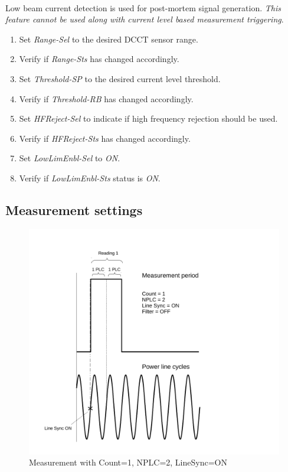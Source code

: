 \documentclass[openany]{article}
\begin{document}
		\paragraph{} Low beam current detection is used for post-mortem signal generation. \emph{This feature cannot be used along with current level based measurement triggering}.

			\begin{enumerate}
				\item Set \emph{Range-Sel} to the desired DCCT sensor range.
				\item Verify if \emph{Range-Sts} has changed accordingly.
				\item Set \emph{Threshold-SP} to the desired current level threshold.
				\item Verify if \emph{Threshold-RB} has changed accordingly.
				\item Set \emph{HFReject-Sel} to indicate if high frequency rejection should be used.
				\item Verify if \emph{HFReject-Sts} has changed accordingly.
				\item Set \emph{LowLimEnbl-Sel} to \emph{ON}.
				\item Verify if \emph{LowLimEnbl-Sts} status is \emph{ON}.
			\end{enumerate}

	\subsection{Measurement settings}

		\begin{figure}[!h]
			\caption{Measurement with Count=1, NPLC=2, LineSync=ON}
			\label{fig:meas-param1}
			\centering
			\includegraphics[width=1.0\textwidth]{dcct-meas-param1-image}
		\end{figure}
\end{document}
